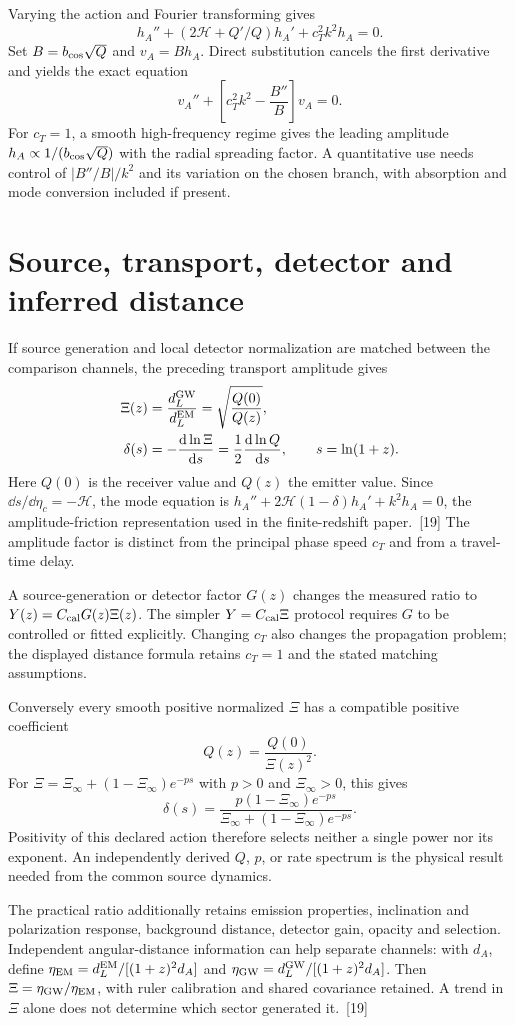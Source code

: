 Varying the action and Fourier transforming gives
\[
 h_A''+(2\mathscr H+Q'/Q)h_A'+c_T^2k^2h_A=0.
\]
Set $B=b_{\rm cos}\sqrt Q$ and $v_A=Bh_A$. Direct substitution cancels the first derivative and yields the exact equation
\[
 v_A''+\left[c_T^2k^2-\frac{B''}{B}\right]v_A=0.
\]
For $c_T=1$, a smooth high-frequency regime gives the leading amplitude $h_A\propto1/(b_{\rm cos}\sqrt Q)$ with the radial spreading factor. A quantitative use needs control of $|B''/B|/k^2$ and its variation on the chosen branch, with absorption and mode conversion included if present.

\section{Source, transport, detector and inferred distance}
If source generation and local detector normalization are matched between the comparison channels, the preceding transport amplitude gives
\[
\begin{aligned}
 \Xi(z)&=\frac{d_L^{\rm GW}}{d_L^{\rm EM}}
       =\sqrt{\frac{Q(0)}{Q(z)}},\\
 \delta(s)&=-\frac{\mathrm{d}\ln\Xi}{\mathrm{d} s}
       =\frac12\frac{\mathrm{d}\ln Q}{\mathrm{d} s},\qquad s=\ln(1+z).
\end{aligned}
\]
Here $Q(0)$ is the receiver value and $Q(z)$ the emitter value. Since $\dd s/\dd\eta_c=-\mathscr H$, the mode equation is $h_A''+2\mathscr H(1-\delta)h_A'+k^2h_A=0$, the amplitude-friction representation used in the finite-redshift paper.~[19] The amplitude factor is distinct from the principal phase speed $c_T$ and from a travel-time delay.

A source-generation or detector factor $G(z)$ changes the measured ratio to $Y(z)=C_{\rm cal}G(z)\Xi(z)$. The simpler $Y=C_{\rm cal}\Xi$ protocol requires $G$ to be controlled or fitted explicitly. Changing $c_T$ also changes the propagation problem; the displayed distance formula retains $c_T=1$ and the stated matching assumptions.

Conversely every smooth positive normalized $\Xi$ has a compatible positive coefficient
\[
 Q(z)=\frac{Q(0)}{\Xi(z)^2}.
\]
For $\Xi=\Xi_\infty+(1-\Xi_\infty)e^{-ps}$ with $p>0$ and $\Xi_\infty>0$, this gives
\[
 \delta(s)=\frac{p(1-\Xi_\infty)e^{-ps}}{\Xi_\infty+(1-\Xi_\infty)e^{-ps}}.
\]
Positivity of this declared action therefore selects neither a single power nor its exponent. An independently derived $Q$, $p$, or rate spectrum is the physical result needed from the common source dynamics.

The practical ratio additionally retains emission properties, inclination and polarization response, background distance, detector gain, opacity and selection. Independent angular-distance information can help separate channels: with $d_A$, define $\eta_{\rm EM}=d_L^{\rm EM}/[(1+z)^2d_A]$ and $\eta_{\rm GW}=d_L^{\rm GW}/[(1+z)^2d_A]$. Then $\Xi=\eta_{\rm GW}/\eta_{\rm EM}$, with ruler calibration and shared covariance retained. A trend in $\Xi$ alone does not determine which sector generated it.~[19]
